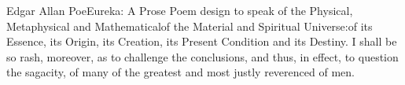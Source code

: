 %

\cleardoublepage
\thispagestyle{empty}


\begin{vplace}[2]
\begin{epiquote}{Edgar Allan Poe}{Eureka: A Prose Poem}
    \lettrine[lraise=0.05,findent=2pt,nindent=2pt]{\normalfont{}}{} %
    design to speak of the Physical, Metaphysical and Mathematical{\emdash}of the Material and Spiritual Universe:{\emdash}of its Essence, its Origin, its Creation, its Present Condition and its Destiny. I shall be so rash, moreover, as to challenge the conclusions, and thus, in effect, to question the sagacity, of many of the greatest and most justly reverenced of men.%
\end{epiquote}
\end{vplace}

\clearpage
